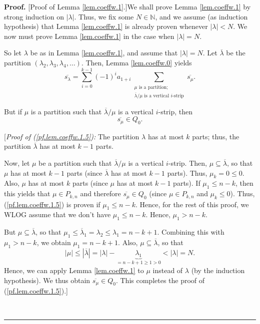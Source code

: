 \documentclass[numbers=enddot,12pt,final,onecolumn,notitlepage]{scrartcl}%
\theoremstyle{definition}
\newenvironment{proof}[1][Proof]{\noindent\textbf{#1.} }{\ \rule{0.5em}{0.5em}}
\let\sumnonlimits\sum
\renewcommand{\sum}{\sumnonlimits\limits}
\begin{document}
\begin{proof}
[Proof of Lemma \ref{lem.coeffw.1}.]We shall prove Lemma \ref{lem.coeffw.1} by
strong induction on $\left\vert \lambda\right\vert $. Thus, we fix some
$N\in\mathbb{N}$, and we assume (as induction hypothesis) that Lemma
\ref{lem.coeffw.1} is already proven whenever $\left\vert \lambda\right\vert
<N$. We now must prove Lemma \ref{lem.coeffw.1} in the case when $\left\vert
\lambda\right\vert =N$.

So let $\lambda$ be as in Lemma \ref{lem.coeffw.1}, and assume that
$\left\vert \lambda\right\vert =N$. Let $\overline{\lambda}$ be the partition
$\left(  \lambda_{2},\lambda_{3},\lambda_{4},\ldots\right)  $. Then, Lemma
\ref{lem.coeffw.0} yields%
\begin{equation}
\overline{s_{\lambda}}=\sum_{i=0}^{k-1}\left(  -1\right)  ^{i}a_{1+i}%
\sum_{\substack{\mu\text{ is a partition;}\\\overline{\lambda}/\mu\text{ is a
vertical }i\text{-strip}}}\overline{s_{\mu}}. \label{pf.lem.coeffw.1.3}%
\end{equation}


But if $\mu$ is a partition such that $\overline{\lambda}/\mu$ is a vertical
$i$-strip, then%
\begin{equation}
\overline{s_{\mu}}\in Q_{0}. \label{pf.lem.coeffw.1.5}%
\end{equation}


[\textit{Proof of (\ref{pf.lem.coeffw.1.5}):} The partition $\lambda$ has at
most $k$ parts; thus, the partition $\overline{\lambda}$ has at most $k-1$ parts.

Now, let $\mu$ be a partition such that $\overline{\lambda}/\mu$ is a vertical
$i$-strip. Then, $\mu\subseteq\overline{\lambda}$, so that $\mu$ has at most
$k-1$ parts (since $\overline{\lambda}$ has at most $k-1$ parts). Thus,
$\mu_{k}=0\leq0$. Also, $\mu$ has at most $k$ parts (since $\mu$ has at most
$k-1$ parts). If $\mu_{1}\leq n-k$, then this yields that $\mu\in P_{k,n}$ and
therefore $\overline{s_{\mu}}\in Q_{0}$ (since $\mu\in P_{k,n}$ and $\mu
_{k}\leq0$). Thus, (\ref{pf.lem.coeffw.1.5}) is proven if $\mu_{1}\leq n-k$.
Hence, for the rest of this proof, we WLOG assume that we don't have $\mu
_{1}\leq n-k$. Hence, $\mu_{1}>n-k$.

But $\mu\subseteq\overline{\lambda}$, so that $\mu_{1}\leq\overline{\lambda
}_{1}=\lambda_{2}\leq\lambda_{1}=n-k+1$. Combining this with $\mu_{1}>n-k$, we
obtain $\mu_{1}=n-k+1$. Also, $\mu\subseteq\overline{\lambda}$, so that
\[
\left\vert \mu\right\vert \leq\left\vert \overline{\lambda}\right\vert
=\left\vert \lambda\right\vert -\underbrace{\lambda_{1}}_{=n-k+1\geq
1>0}<\left\vert \lambda\right\vert =N.
\]
Hence, we can apply Lemma \ref{lem.coeffw.1} to $\mu$ instead of $\lambda$ (by
the induction hypothesis). We thus obtain $\overline{s_{\mu}}\in Q_{0}$. This
completes the proof of (\ref{pf.lem.coeffw.1.5}).]


\end{proof}
\end{document}
